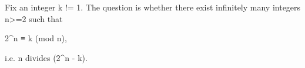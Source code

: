 Fix an integer k != 1. The question is whether there exist infinitely many integers n>=2 such that

    2^n ≡ k (mod n),

i.e. n divides (2^n - k).
